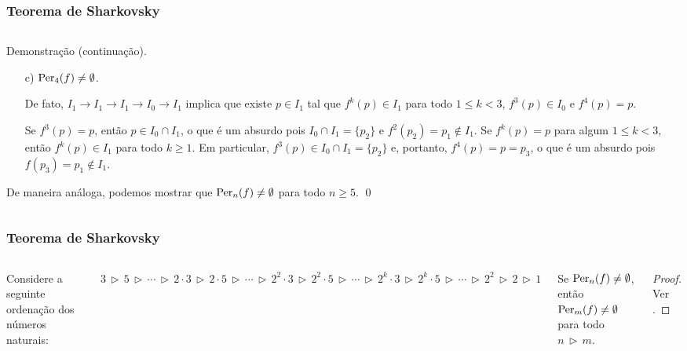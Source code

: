 \begin{frame}
\vspace{5pt}
\frametitle{Teorema de Sharkovsky}
\begin{columns}
\column{\dimexpr\paperwidth-15pt}

\begin{block}{Demonstração (continuação).}
\begin{enumerate}
\item[c)] \textit{$\operatorname{Per}_4(f) \neq \emptyset$.}

De fato, $I_1 \longrightarrow I_1 \longrightarrow I_1 \longrightarrow I_0 \longrightarrow I_1$ implica que existe $p \in I_1$ tal que $f^k(p) \in I_1$ para todo $1 \leq k < 3$, $f^3(p) \in I_0$ e $f^4(p) = p$.

Se $f^3(p) = p$, então $p \in I_0 \cap I_1$, o que é um absurdo pois $I_0 \cap I_1 = \lbrace p_2 \rbrace$ e $f^2(p_2) = p_1 \notin I_1$.
Se $f^k(p) = p$ para algum $1 \leq k < 3$, então $f^k(p) \in I_1$ para todo $k \geq 1$.
Em particular, $f^3(p) \in I_0 \cap I_1 = \lbrace p_2 \rbrace$ e, portanto, $f^4(p) = p = p_3$, o que é um absurdo pois $f(p_3) = p_1 \notin I_1$.
\end{enumerate}
De maneira análoga, podemos mostrar que $\operatorname{Per}_n(f) \neq \emptyset$ para todo $n \geq 5$.
\qed
\end{block}

\end{columns}
\end{frame}


\begin{frame}
\vspace{5pt}
\frametitle{Teorema de Sharkovsky}
\begin{columns}
\column{\dimexpr\paperwidth-15pt}

Considere a seguinte ordenação dos números naturais:

\begin{definition}
$3 \, \triangleright \, 5 
\, \triangleright \, \cdots \, \triangleright \,
2 \cdot 3 \, \triangleright \, 2 \cdot 5 
\, \triangleright \, \cdots \, \triangleright \,
2^2 \cdot 3 \, \triangleright \, 2^2 \cdot 5
\, \triangleright \, \cdots \, \triangleright \,
2^k \cdot 3 \, \triangleright \, 2^k \cdot 5
\, \triangleright \, \cdots \, \triangleright \,
2^2 \, \triangleright \, 2 \, \triangleright \, 1$
\end{definition}

\vspace{10pt}

\begin{theorem}[Sharkovsky]
Se $\operatorname{Per}_n(f) \neq \emptyset$, então $\operatorname{Per}_m(f) \neq \emptyset$ para todo $n \, \triangleright \, m$.
\end{theorem}

\begin{proof}
Ver \cite{burns}.
\end{proof}

\end{columns}
\end{frame}


